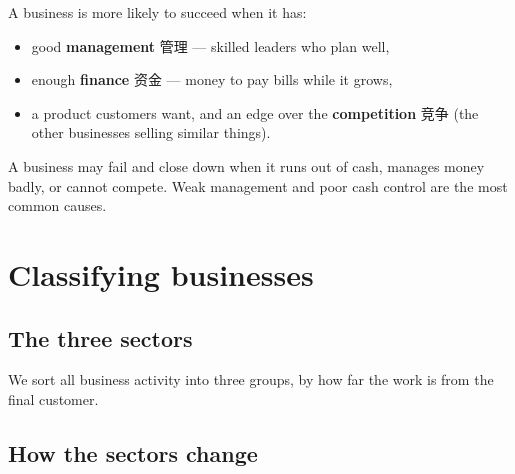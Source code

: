 \documentclass[11pt]{article}
\begin{document}
A business is more likely to succeed when it has:

\begin{itemize}
\item good \textbf{management} 管理 — skilled leaders who plan well,

\item enough \textbf{finance} 资金 — money to pay bills while it grows,

\item a product customers want, and an edge over the \textbf{competition} 竞争 (the other businesses selling similar things).

\end{itemize}

A business may fail and close down when it runs out of cash, manages money badly, or cannot compete. Weak management and poor cash control are the most common causes.

\section*{Classifying businesses}

\subsection*{The three sectors}

We sort all business activity into three groups, by how far the work is from the final customer.

\begin{center}
\end{center}

\subsection*{How the sectors change}
\end{document}

